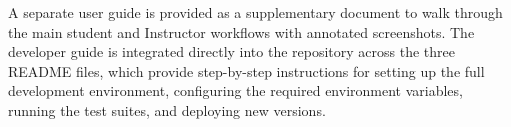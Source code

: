 A separate user guide is provided as a supplementary document to walk through the main student and Instructor workflows with annotated screenshots. The developer guide is integrated directly into the repository across the three README files, which provide step-by-step instructions for setting up the full development environment, configuring the required environment variables, running the test suites, and deploying new versions.